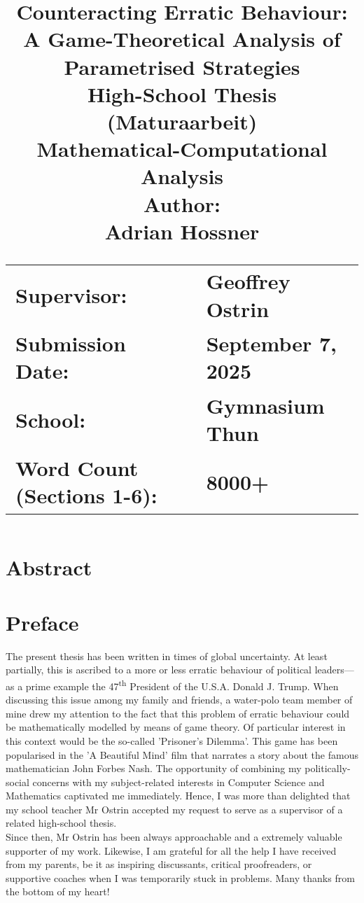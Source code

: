 \documentclass[11pt]{article}
\title{
	\textbf{Counteracting Erratic Behaviour:}\\
	\textbf{A Game-Theoretical Analysis of Parametrised Strategies}\\[\dvdist ex]
	\Large{High-School Thesis}\\
	\Large{(Maturaarbeit)}\\[\vdist ex]
	\Large{Mathematical-Computational}\\
	\Large{Analysis}\\[\vdist ex]
	\Large{Author:}\\
	\Large{Adrian Hossner}\\[3\vdist ex]
	\begin{flushleft}
		\begin{tabular}{>{\raggedright\arraybackslash}p{6cm} >{\raggedright\arraybackslash}p{5cm}}
			\Large{Supervisor: } & \Large{Geoffrey Ostrin}\\[\vdist ex]
			\Large{Submission Date: } & \Large{September 7, 2025}\\[\vdist ex]
			\Large{School: } & \Large{Gymnasium Thun}\\[\vdist ex]
			\Large{Word Count (Sections 1-6): } & \Large{8000+}\\[\vdist ex]
		\end{tabular}
	\end{flushleft}
}
\date{ } %
\begin{document}
\maketitle
{}

\newpage
{}

\section*{Abstract}

\newpage

\section*{Preface}
The present thesis has been written in times of global uncertainty.
At least partially, this is ascribed to a more or less erratic behaviour of political leaders---as a prime example the 47\textsuperscript{th} President of the U.S.A. Donald J. Trump.
When discussing this issue among my family and friends, a water-polo team member of mine drew my attention to the fact that this problem of erratic behaviour could be mathematically modelled by means of game theory.
Of particular interest in this context would be the so-called 'Prisoner's Dilemma'.
This game has been popularised in the 'A Beautiful Mind' film that narrates a story about the famous mathematician John Forbes Nash.
The opportunity of combining my politically-social concerns with my subject-related interests in Computer Science and Mathematics captivated me immediately.
Hence, I was more than delighted that my school teacher Mr Ostrin accepted my request to serve as a supervisor of a related high-school thesis.\\
\indent Since then, Mr Ostrin has been always approachable and a extremely valuable supporter of my work.
Likewise, I am grateful for all the help I have received from my parents, be it as inspiring discussants, critical proofreaders, or supportive coaches when I was temporarily stuck in problems. Many thanks from the bottom of my heart!
\end{document}
